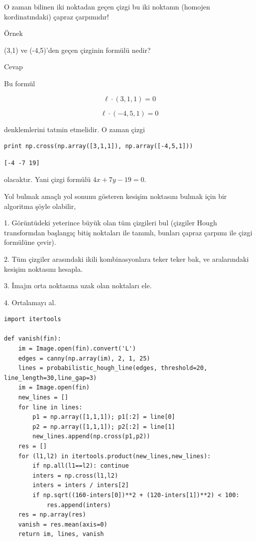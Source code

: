 \documentclass[12pt,fleqn]{article}\usepackage{../../common}
\begin{document}
O zaman bilinen iki noktadan geçen çizgi bu iki noktanın (homojen
kordinatındaki) çapraz çarpımıdır! 

Örnek

(3,1) ve (-4,5)'den geçen çizginin formülü nedir? 

Cevap

Bu formül 

$$ \ell \cdot (3,1,1) = 0$$

$$ \ell \cdot (-4,5,1) = 0$$

denklemlerini tatmin etmelidir. O zaman çizgi 

\begin{verbatim}
print np.cross(np.array([3,1,1]), np.array([-4,5,1]))
\end{verbatim}

\begin{verbatim}
[-4 -7 19]
\end{verbatim}

olacaktır. Yani çizgi formülü $4x + 7y - 19 = 0$. 

Yol bulmak amaçlı yol sonunu gösteren kesişim noktasını bulmak için bir
algoritma şöyle olabilir,

1. Görüntüdeki yeterince büyük olan tüm çizgileri bul (çizgiler Hough
transformdan başlangıç bitiş noktaları ile tanımlı, bunları çapraz çarpımı
ile çizgi formülüne çevir).

2. Tüm çizgiler arasındaki ikili kombinasyonlara teker teker bak, ve
aralarındaki kesişim noktasını hesapla. 

3. İmajın orta noktasına uzak olan noktaları ele. 

4. Ortalamayı al.

\begin{verbatim}
import itertools

def vanish(fin):
    im = Image.open(fin).convert('L')
    edges = canny(np.array(im), 2, 1, 25)
    lines = probabilistic_hough_line(edges, threshold=20, line_length=30,line_gap=3)
    im = Image.open(fin)
    new_lines = []
    for line in lines:
        p1 = np.array([1,1,1]); p1[:2] = line[0] 
        p2 = np.array([1,1,1]); p2[:2] = line[1] 
        new_lines.append(np.cross(p1,p2))
    res = []
    for (l1,l2) in itertools.product(new_lines,new_lines):
        if np.all(l1==l2): continue
        inters = np.cross(l1,l2) 
        inters = inters / inters[2]
        if np.sqrt((160-inters[0])**2 + (120-inters[1])**2) < 100: 
            res.append(inters)
    res = np.array(res)
    vanish = res.mean(axis=0)
    return im, lines, vanish
\end{verbatim}
\end{document}
